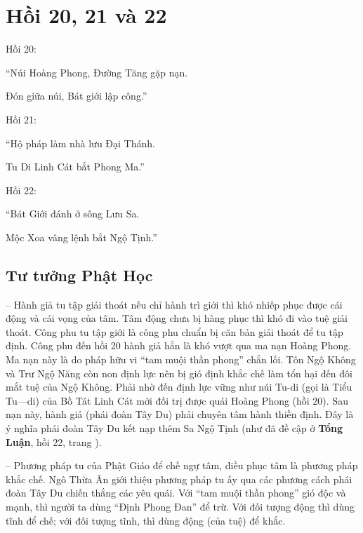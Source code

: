 \chapter{Hồi 20, 21 và 22} %
\label{cha:hoi_20_21_22}

Hồi 20:

\begin{itshape}
``Núi Hoàng Phong, Đường Tăng gặp nạn.

Đón giữa núi, Bát giới lập công.''
\end{itshape}

Hồi 21:

\begin{itshape}
``Hộ pháp làm nhà lưu Đại Thánh.

Tu Di Linh Cát bắt Phong Ma.''
\end{itshape}

Hồi 22:

\begin{itshape}
``Bát Giới đánh ở sông Lưu Sa.

Mộc Xoa vâng lệnh bắt Ngộ Tịnh.''
\end{itshape}

\section{Tư tưởng Phật Học} %
\label{sec:20_21_22_phat_hoc}

-- Hành giả tu tập giải thoát nếu chỉ hành trì giới thì khó nhiếp phục được cái động và cái vọng của tâm. Tâm động chưa bị hàng phục thì khó đi vào tuệ giải thoát. Công phu tu tập giới là công phu chuẩn bị căn bản giải thoát để tu tập định. Công phu đến hồi 20 hành giả hẳn là khó vượt qua ma nạn Hoàng Phong. Ma nạn này là do pháp hữu vi ``tam muội thần phong'' chắn lối. Tôn Ngộ Không và Trư Ngộ Năng còn non định lực nên bị gió định khắc chế làm tổn hại đến đôi mắt tuệ của Ngộ Không. Phải nhờ đến định lực vững như núi Tu-di (gọi là Tiểu Tu---di) của Bồ Tát Linh Cát mới đối trị được quái Hoàng Phong (hồi 20). Sau nạn này, hành giả (phái đoàn Tây Du) phải chuyên tâm hành thiền định. Đây là ý nghĩa phái đoàn Tây Du kết nạp thêm Sa Ngộ Tịnh (như đã đề cập ở {\bf Tổng Luận}, hồi 22, trang \pageref{sub:ve_sa_ngo_tinh}).

-- Phương pháp tu của Phật Giáo để chế ngự tâm, điều phục tâm là phương pháp khắc chế. Ngô Thừa Ân giới thiệu phương pháp tu ấy qua các phương cách phái đoàn Tây Du chiến thắng các yêu quái. Với ``tam muội thần phong'' gió độc và mạnh, thì người ta dùng ``Định Phong Đan'' để trừ. Với đối tượng động thì dùng tĩnh để chế; với đối tượng tĩnh, thì dùng động (của tuệ) để khắc.

